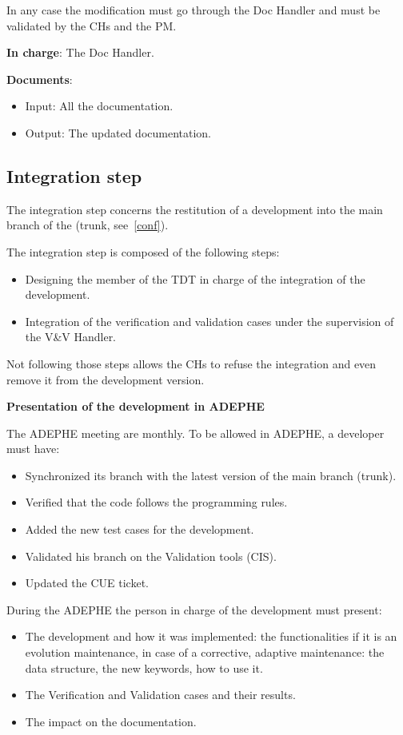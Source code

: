 In any case the modification must go through the Doc Handler and must be
validated by the CHs and the PM\@.

\textbf{In charge}: The Doc Handler.

\textbf{Documents}:
\begin{itemize}
\item Input: All the documentation.
\item Output: The updated documentation.
\end{itemize}

\subsection{Integration step}

The integration step concerns the restitution of a development into the
main branch of the \telemacsystem{} (trunk, see~\ref{conf}).

The integration step is composed of the following steps:
\begin{itemize}
\item Designing the member of the TDT in charge of the integration of the
  development.
\item Integration of the verification and validation cases under the
  supervision of the V\&V Handler.
\end{itemize}

Not following those steps allows the CHs to refuse the integration and even
remove it from the development version.

\textbf{Presentation of the development in ADEPHE}

The ADEPHE meeting are monthly.
To be allowed in ADEPHE, a developer must have:
\begin{itemize}
\item Synchronized its branch with the latest version of the main branch
  (trunk).
\item Verified that the code follows the programming rules.
\item Added the new test cases for the development.
\item Validated his branch on the Validation tools (CIS).
\item Updated the CUE ticket.
\end{itemize}

During the ADEPHE the person in charge of the development must present:
\begin{itemize}
\item The development and how it was implemented: the functionalities if it is
  an evolution maintenance, in case of a corrective, adaptive maintenance: the
  data structure, the new keywords, how to use it.
\item The Verification and Validation cases and their results.
\item The impact on the documentation.
\end{itemize}

